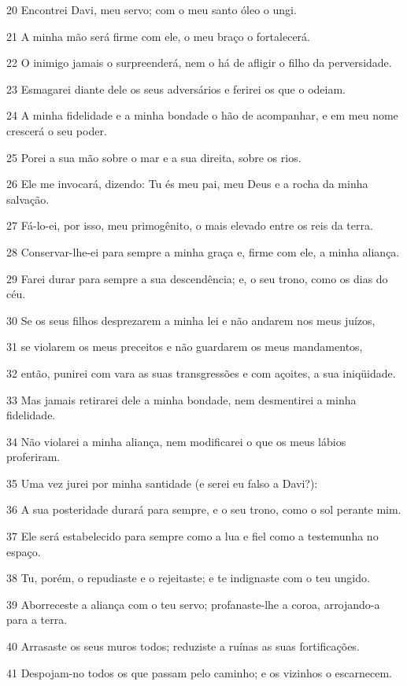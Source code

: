 \par 20 Encontrei Davi, meu servo; com o meu santo óleo o ungi.
\par 21 A minha mão será firme com ele, o meu braço o fortalecerá.
\par 22 O inimigo jamais o surpreenderá, nem o há de afligir o filho da perversidade.
\par 23 Esmagarei diante dele os seus adversários e ferirei os que o odeiam.
\par 24 A minha fidelidade e a minha bondade o hão de acompanhar, e em meu nome crescerá o seu poder.
\par 25 Porei a sua mão sobre o mar e a sua direita, sobre os rios.
\par 26 Ele me invocará, dizendo: Tu és meu pai, meu Deus e a rocha da minha salvação.
\par 27 Fá-lo-ei, por isso, meu primogênito, o mais elevado entre os reis da terra.
\par 28 Conservar-lhe-ei para sempre a minha graça e, firme com ele, a minha aliança.
\par 29 Farei durar para sempre a sua descendência; e, o seu trono, como os dias do céu.
\par 30 Se os seus filhos desprezarem a minha lei e não andarem nos meus juízos,
\par 31 se violarem os meus preceitos e não guardarem os meus mandamentos,
\par 32 então, punirei com vara as suas transgressões e com açoites, a sua iniqüidade.
\par 33 Mas jamais retirarei dele a minha bondade, nem desmentirei a minha fidelidade.
\par 34 Não violarei a minha aliança, nem modificarei o que os meus lábios proferiram.
\par 35 Uma vez jurei por minha santidade (e serei eu falso a Davi?):
\par 36 A sua posteridade durará para sempre, e o seu trono, como o sol perante mim.
\par 37 Ele será estabelecido para sempre como a lua e fiel como a testemunha no espaço.
\par 38 Tu, porém, o repudiaste e o rejeitaste; e te indignaste com o teu ungido.
\par 39 Aborreceste a aliança com o teu servo; profanaste-lhe a coroa, arrojando-a para a terra.
\par 40 Arrasaste os seus muros todos; reduziste a ruínas as suas fortificações.
\par 41 Despojam-no todos os que passam pelo caminho; e os vizinhos o escarnecem.
